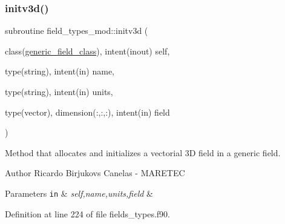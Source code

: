 \subsubsection{\texorpdfstring{initv3d()}{initv3d()}}
{\footnotesize\ttfamily subroutine field\+\_\+types\+\_\+mod\+::initv3d (\begin{DoxyParamCaption}\item[{class(\mbox{\hyperlink{structfield__types__mod_1_1generic__field__class}{generic\+\_\+field\+\_\+class}}), intent(inout)}]{self,  }\item[{type(string), intent(in)}]{name,  }\item[{type(string), intent(in)}]{units,  }\item[{type(vector), dimension(\+:,\+:,\+:), intent(in)}]{field }\end{DoxyParamCaption})\hspace{0.3cm}{\ttfamily [private]}}



Method that allocates and initializes a vectorial 3D field in a generic field. 

\begin{DoxyAuthor}{Author}
Ricardo Birjukovs Canelas -\/ M\+A\+R\+E\+T\+EC 
\end{DoxyAuthor}

\begin{DoxyParams}[1]{Parameters}
\mbox{\tt in}  & {\em self,name,units,field} & \\
\hline
\end{DoxyParams}


Definition at line 224 of file fields\+\_\+types.\+f90.


